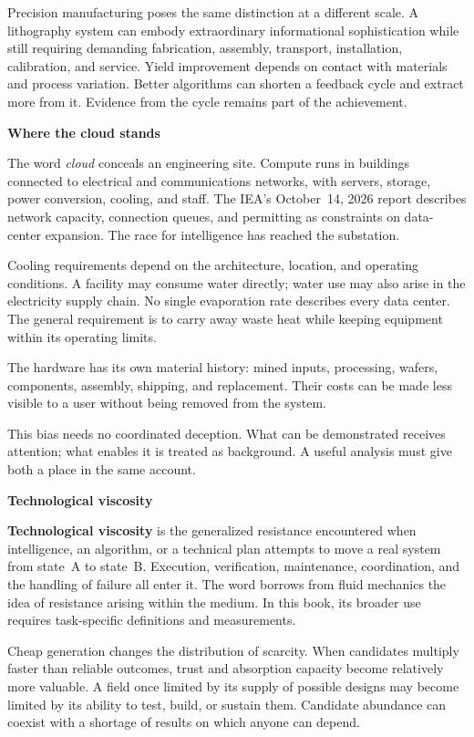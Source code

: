 \documentclass[11pt,openany]{book}
\newcommand{\term}[1]{\textbf{#1}}
\newcommand{\subhead}[1]{\par\medskip\noindent\textbf{#1}\par\nobreak\smallskip}
\begin{document}
Precision manufacturing poses the same distinction at a different scale. A lithography system can embody extraordinary informational sophistication while still requiring demanding fabrication, assembly, transport, installation, calibration, and service. Yield improvement depends on contact with materials and process variation. Better algorithms can shorten a feedback cycle and extract more from it. Evidence from the cycle remains part of the achievement.

\subhead{Where the cloud stands}

The word \emph{cloud} conceals an engineering site. Compute runs in buildings connected to electrical and communications networks, with servers, storage, power conversion, cooling, and staff. The IEA's October~14, 2026 report describes network capacity, connection queues, and permitting as constraints on data-center expansion.\cite{iea2026powering} The race for intelligence has reached the substation.

Cooling requirements depend on the architecture, location, and operating conditions. A facility may consume water directly; water use may also arise in the electricity supply chain. No single evaporation rate describes every data center. The general requirement is to carry away waste heat while keeping equipment within its operating limits.

The hardware has its own material history: mined inputs, processing, wafers, components, assembly, shipping, and replacement. Their costs can be made less visible to a user without being removed from the system.

This bias needs no coordinated deception. What can be demonstrated receives attention; what enables it is treated as background. A useful analysis must give both a place in the same account.

\subhead{Technological viscosity}

\term{Technological viscosity} is the generalized resistance encountered when intelligence, an algorithm, or a technical plan attempts to move a real system from state~A to state~B. Execution, verification, maintenance, coordination, and the handling of failure all enter it. The word borrows from fluid mechanics the idea of resistance arising within the medium. In this book, its broader use requires task-specific definitions and measurements.

Cheap generation changes the distribution of scarcity. When candidates multiply faster than reliable outcomes, trust and absorption capacity become relatively more valuable. A field once limited by its supply of possible designs may become limited by its ability to test, build, or sustain them. Candidate abundance can coexist with a shortage of results on which anyone can depend.
\end{document}
